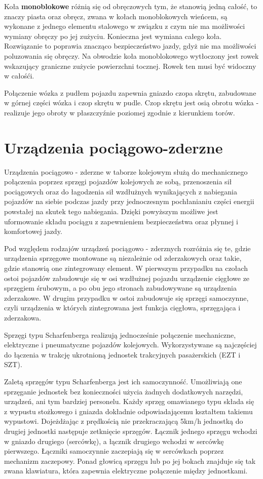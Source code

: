 Koła \textbf{monoblokowe} różnią się od obręczowych tym, że stanowią jedną całość, to znaczy piasta oraz obręcz, zwana w kołach monoblokowych wieńcem, są wykonane z jednego elementu stalowego w związku z czym nie ma możliwości wymiany obręczy po jej zużyciu. Konieczna jest wymiana całego koła. Rozwiązanie to poprawia znacząco bezpieczeństwo jazdy, gdyż nie ma możliwości poluzowania się obręczy. Na obwodzie koła monoblokowego wytłoczony jest rowek wskazujący graniczne zużycie powierzchni tocznej. Rowek ten musi być widoczny w całośći.

Połączenie wózka z pudłem pojazdu zapewnia gniazdo czopa skrętu, zabudowane w górnej części wózka i czop skrętu w pudle. Czop skrętu jest osią obrotu wózka - realizuje jego obroty w płaszczyźnie poziomej zgodnie z kierunkiem torów.  

\section{Urządzenia pociągowo-zderzne}

Urządzenia pociągowo - zderzne w taborze kolejowym służą do mechanicznego połączenia poprzez sprzęgi pojazdów kolejowych ze sobą, przenoszenia sił pociągowych oraz do łagodzenia sił wzdłużnych wynikających z nabiegania pojazdów na siebie podczas jazdy przy jednoczesnym pochłanianiu części energii powstałej na skutek tego nabiegania. Dzięki powyższym możliwe jest uformowanie składu pociągu z zapewnieniem bezpieczeństwa oraz płynnej i komfortowej jazdy.

Pod względem rodzajów urządzeń pociągowo - zderznych rozróżnia się te, gdzie urządzenia sprzęgowe montowane są niezależnie od zderzakowych oraz takie, gdzie stanowią one zintegrowany element.
W pierwszym przypadku na czołach ostoi pojazdów zabudowuje się w osi wzdłużnej pojazdu urządzenie cięgłowe ze sprzęgiem śrubowym, a po obu jego stronach zabudowywane są urządzenia zderzakowe. W drugim przypadku w ostoi zabudowuje się sprzęgi samoczynne, czyli urządzenia w których zintegrowana jest funkcja cięgłowa, sprzęgająca i zderzakowa.

Sprzęgi typu Scharfenberga realizują jednocześnie połączenie mechaniczne, elektryczne i pneumatyczne pojazdów kolejowych. Wykorzystywane są najczęściej do łączenia w trakcję ukrotnioną jednostek trakcyjnych pasażerskich (EZT i SZT).

Zaletą sprzęgów typu Scharfenberga jest ich samoczynność. Umożliwiają one sprzęganie jednostek bez konieczności użycia żadnych dodatkowych narzędzi, urządzeń, ani tym bardziej personelu. Każdy sprzęg omawianego typu składa się z wypustu stożkowego i gniazda dokładnie odpowiadającemu kształtem takiemu wypustowi.
Dojeżdżając z prędkością nie przekraczającą 5km/h jednostką do drugiej jednostki następuje zetknięcie sprzęgów. Łącznik jednego sprzęgu wchodzi w gniazdo drugiego (sercówkę), a łącznik drugiego wchodzi w sercówkę pierwszego. Łączniki samoczynnie zaczepiają się w sercówkach poprzez mechanizm zaczepowy. Ponad głowicą sprzęgu lub po jej bokach znajduje się tak zwana klawiatura, która zapewnia elektryczne połączenie między jednostkami.

